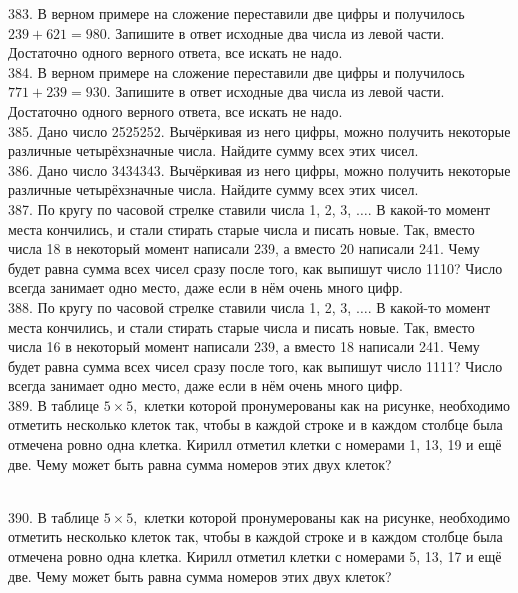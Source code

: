 383. В верном примере на сложение переставили две цифры и получилось $239+621=980.$ Запишите в ответ исходные два числа из левой части. Достаточно одного верного ответа, все искать не надо.\\
384. В верном примере на сложение переставили две цифры и получилось $771+239=930.$ Запишите в ответ исходные два числа из левой части. Достаточно одного верного ответа, все искать не надо.\\
385. Дано число 2525252. Вычёркивая из него цифры, можно получить некоторые различные четырёхзначные числа. Найдите сумму всех этих чисел.\\
386. Дано число 3434343. Вычёркивая из него цифры, можно получить некоторые различные четырёхзначные числа. Найдите сумму всех этих чисел.\\
387. По кругу по часовой стрелке ставили числа 1, 2, 3, $\ldots.$ В какой-то момент места кончились, и стали стирать старые числа и писать новые. Так, вместо числа 18 в некоторый момент написали 239, а вместо 20 написали 241. Чему будет равна сумма всех чисел сразу после того, как выпишут число 1110? Число всегда занимает одно место, даже если в нём очень много цифр.\\
388. По кругу по часовой стрелке ставили числа 1, 2, 3, $\ldots.$ В какой-то момент места кончились, и стали стирать старые числа и писать новые. Так, вместо числа 16 в некоторый момент написали 239, а вместо 18 написали 241. Чему будет равна сумма всех чисел сразу после того, как выпишут число 1111? Число всегда занимает одно место, даже если в нём очень много цифр.\\
389. В таблице $5\times5,$ клетки которой пронумерованы как на рисунке, необходимо отметить несколько клеток так, чтобы в каждой строке и в каждом столбце была отмечена ровно одна клетка. Кирилл отметил клетки с номерами 1, 13, 19 и ещё две. Чему может быть равна сумма номеров этих двух клеток?\\
\begin{figure}[ht!]
\end{figure}\\
390. В таблице $5\times5,$ клетки которой пронумерованы как на рисунке, необходимо отметить несколько клеток так, чтобы в каждой строке и в каждом столбце была отмечена ровно одна клетка. Кирилл отметил клетки с номерами 5, 13, 17 и ещё две. Чему может быть равна сумма номеров этих двух клеток?\\
\begin{figure}[ht!]
\end{figure}\\
